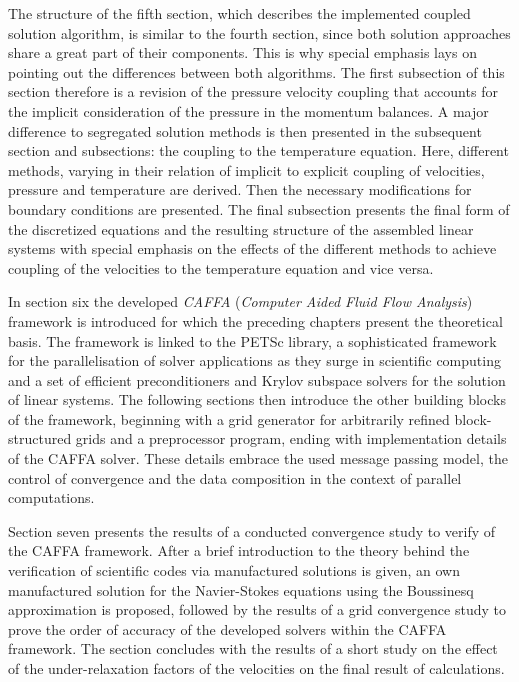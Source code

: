 The structure of the fifth section, which describes the implemented coupled solution algorithm, is similar to the fourth section, since both solution approaches share a great part of their components. This is why special emphasis lays on pointing out the differences between both algorithms. The first subsection of this section therefore is a revision of the pressure velocity coupling that accounts for the implicit consideration of the pressure in the momentum balances. A major difference to segregated solution methods is then presented in the subsequent section and subsections: the coupling to the temperature equation. Here, different methods, varying in their relation of implicit to explicit coupling of velocities, pressure and temperature are derived. Then the necessary modifications for boundary conditions are presented. The final subsection presents the final form of the discretized equations and the resulting structure of the assembled linear systems with special emphasis on the effects of the different methods to achieve coupling of the velocities to the temperature equation and vice versa.

In section six the developed \emph{CAFFA} (\emph{Computer Aided Fluid Flow Analysis}) framework is introduced for which the preceding chapters present the theoretical basis. The framework is linked to the PETSc library, a sophisticated framework for the parallelisation of solver applications as they surge in scientific computing and a set of efficient preconditioners and Krylov subspace solvers for the solution of linear systems. The following sections then introduce the other building blocks of the framework, beginning with a grid generator for arbitrarily refined block-structured grids and a preprocessor program, ending with implementation details of the CAFFA solver. These details embrace the used message passing model, the control of convergence and the data composition in the context of parallel computations.

Section seven presents the results of a conducted convergence study to verify of the CAFFA framework. After a brief introduction to the theory behind the verification of scientific codes via manufactured solutions is given, an own manufactured solution for the Navier-Stokes equations using the Boussinesq approximation is proposed, followed by the results of a grid convergence study to prove the order of accuracy of the developed solvers within the CAFFA framework. The section concludes with the results of a short study on the effect of the under-relaxation factors of the velocities on the final result of calculations.

